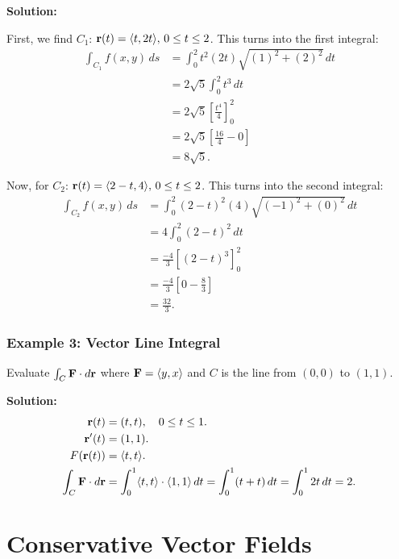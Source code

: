 \textbf{Solution:}

First, we find \(C_{1}\): \(\mathbf{r}(t) = \langle t,2t\rangle, \, 0 \leq t \leq 2\). This turns into the first integral:
\begin{align*}
    \int_{C_{1}} f(x,y) \, ds &= \int_{0}^{2} t^{2}(2t) \sqrt{(1)^{2} + (2)^{2}} \, dt \\
    &= 2\sqrt{5} \int_{0}^{2} t^{3}  \, dt \\
    &= 2\sqrt{5} \left[ \frac{t^{4}}{4} \right]_{0}^{2} \\
    &= 2\sqrt{5} \left[ \frac{16}{4} - 0 \right] \\
    &= 8\sqrt{5}.
\end{align*}

Now, for \(C_{2}\): \(\mathbf{r}(t) = \langle 2 - t, 4\rangle, \, 0 \leq t \leq 2\). This turns into the second integral:
\begin{align*}
    \int_{C_{2}} f(x,y) \, ds &= \int_{0}^{2} (2 - t)^{2}(4) \sqrt{(-1)^{2} + (0)^{2}} \, dt \\
    &= 4\int_{0}^{2} (2 - t)^{2} \, dt \\
    &= \frac{-4}{3}\left[ (2 - t)^{3} \right]_{0}^{2} \\
    &= \frac{-4}{3}\left[ 0 - \frac{8}{3} \right] \\
    &= \frac{32}{3}.
\end{align*}

\subsubsection{Example 3: Vector Line Integral}
Evaluate \( \int_C \mathbf{F} \cdot d\mathbf{r} \) where \( \mathbf{F} = \langle y, x \rangle \) and \( C \) is the line from \( (0,0) \) to \( (1,1) \).

\textbf{Solution:}
\begin{align*}
    \mathbf{r}(t) &= (t, t), \quad 0 \leq t \leq 1. \\
    \mathbf{r}'(t) &= (1,1). \\
    F(\mathbf{r}(t)) &= \langle t, t \rangle. \\
    \int_C \mathbf{F} \cdot d\mathbf{r} &= \int_0^1 \langle t, t \rangle \cdot \langle 1, 1 \rangle \, dt = \int_0^1 (t + t) \, dt = \int_0^1 2t \, dt = 2.
\end{align*}

\newpage

\section{Conservative Vector Fields}

